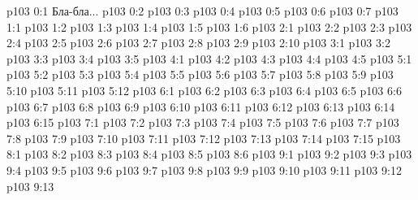 \author{Мелхиседек}
\vs p103 0:1  Бла-бла...
\vs p103 0:2 
\vs p103 0:3 \pc 
\vs p103 0:4 
\vs p103 0:5 
\vs p103 0:6 
\vs p103 0:7 
\vs p103 1:1 
\vs p103 1:2 
\vs p103 1:3 
\vs p103 1:4 
\vs p103 1:5 
\vs p103 1:6 
\vs p103 2:1 
\vs p103 2:2 
\vs p103 2:3 
\vs p103 2:4 
\vs p103 2:5 
\vs p103 2:6 
\vs p103 2:7 
\vs p103 2:8 
\vs p103 2:9 
\vs p103 2:10 
\vs p103 3:1 
\vs p103 3:2 \pc 
\vs p103 3:3 
\vs p103 3:4 \pc 
\vs p103 3:5 
\vs p103 4:1 
\vs p103 4:2 
\vs p103 4:3 
\vs p103 4:4 
\vs p103 4:5 
\vs p103 5:1 
\vs p103 5:2 
\vs p103 5:3 
\vs p103 5:4 
\vs p103 5:5 
\vs p103 5:6 
\vs p103 5:7 \pc 
\vs p103 5:8 \pc 
\vs p103 5:9 
\vs p103 5:10 
\vs p103 5:11 \pc 
\vs p103 5:12 
\vs p103 6:1 
\vs p103 6:2 \pc 
\vs p103 6:3 
\vs p103 6:4 
\vs p103 6:5 \pc 
\vs p103 6:6 
\vs p103 6:7 
\vs p103 6:8 \pc 
\vs p103 6:9 
\vs p103 6:10 \pc 
\vs p103 6:11 \pc 
\vs p103 6:12 
\vs p103 6:13 
\vs p103 6:14 
\vs p103 6:15 
\vs p103 7:1 
\vs p103 7:2 \pc 
\vs p103 7:3 
\vs p103 7:4 \pc 
\vs p103 7:5 
\vs p103 7:6 
\vs p103 7:7 
\vs p103 7:8 \pc 
\vs p103 7:9 
\vs p103 7:10 \pc 
\vs p103 7:11 
\vs p103 7:12 
\vs p103 7:13 \pc 
\vs p103 7:14 \pc 
\vs p103 7:15 
\vs p103 8:1 
\vs p103 8:2 
\vs p103 8:3 
\vs p103 8:4 \pc 
\vs p103 8:5 
\vs p103 8:6 \pc 
{}
\vs p103 9:1 
\vs p103 9:2 
\vs p103 9:3 
\vs p103 9:4 
\vs p103 9:5 
\vs p103 9:6 \pc 
\vs p103 9:7 
\vs p103 9:8 \pc 
\vs p103 9:9 
\vs p103 9:10 
\vs p103 9:11 
\vs p103 9:12 \pc 
\vsetoff
\vs p103 9:13 
\quizlink
